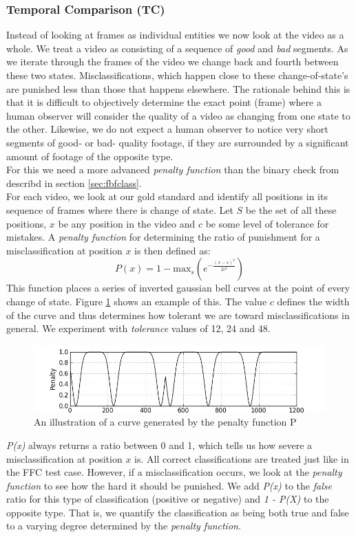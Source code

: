 \subsubsection{Temporal Comparison (TC)}\label{sec:tempclass}
%
Instead of looking at frames as individual entities we now look at the video as a whole. We treat a video as consisting of a sequence of \textit{good} and \textit{bad} segments. As we iterate through the frames of the video we change back and fourth between these two states. Misclassifications, which happen close to these change-of-state's are punished less than those that happens elsewhere. The rationale behind this is that it is difficult to objectively determine the exact point (frame) where a human observer will consider the quality of a video as changing from one state to the other. Likewise, we do not expect a human observer to notice very short segments of good- or bad- quality footage, if they are surrounded by a significant amount of footage of the opposite type.\\
For this we need a more advanced \textit{penalty function} than the binary check from describd in section \ref{sec:fbfclass}.\\
For each video, we look at our gold standard and identify all positions in its sequence of frames where there is change of state. Let $S$ be the set of all these positions, $x$ be any position in the video and $c$ be some level of tolerance for mistakes. A \emph{penalty function} for determining the ratio of punishment for a misclassification at position $x$ is then defined as:
%
\begin{displaymath}
P(x) =1 - \text{max}_{s}(e^{-\frac{(x-s)^{2}}{2c^{2}}})
\end{displaymath}
%
This function places a series of inverted gaussian bell curves at the point of every change of state. Figure \ref{fig:penaltycurve} shows an example of this. The value $c$ defines the width of the curve and thus determines how tolerant we are toward misclassifications in general. We experiment with \textit{tolerance} values of 12, 24 and 48.
%
\begin{figure}
\includegraphics[width=1\textwidth]{img/penaltyfunction.jpg}
\caption{An illustration of a curve generated by the penalty function P}
\label{fig:penaltycurve}
\end{figure}
%
\emph{P(x)} always returns a ratio between 0 and 1, which tells us how severe a misclassification at position $x$ is. All correct classifications are treated just like in the FFC test case. However, if a misclassification occurs, we look at the \textit{penalty function} to see how the hard it should be punished. We add \textit{P(x)} to the \textit{false} ratio for this type of classification (positive or negative) and \textit{1 - P(X)} to the opposite type. That is, we quantify the classification as being both true and false to a varying degree determined by the \textit{penalty function}.
%
